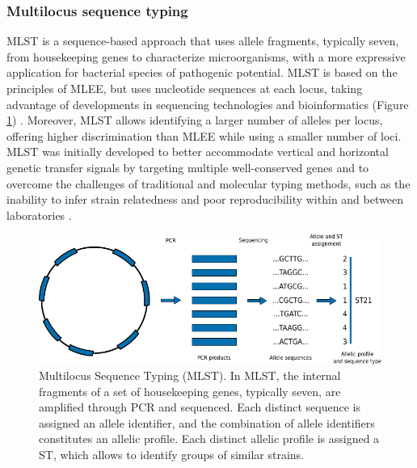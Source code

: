 \subsubsection{Multilocus sequence typing}

\ac{MLST} is a sequence-based approach that uses allele fragments, typically seven, from housekeeping genes to characterize microorganisms, with a more expressive application for bacterial species of pathogenic potential. \ac{MLST} is based on the principles of \ac{MLEE}, but uses nucleotide sequences at each locus, taking advantage of developments in sequencing technologies and bioinformatics (Figure \ref{fig:introduction_figure7}) \cite{urwin_multi-locus_2003}. Moreover, \ac{MLST} allows identifying a larger number of alleles per locus, offering higher discrimination than \ac{MLEE} while using a smaller number of loci. \ac{MLST} was initially developed to better accommodate vertical and horizontal genetic transfer signals by targeting multiple well-conserved genes and to overcome the challenges of traditional and molecular typing methods, such as the inability to infer strain relatedness and poor reproducibility within and between laboratories \cite{maiden_multilocus_1998}.

\begin{figure}[h!]
    \centering
    \includegraphics[angle=0,width=\textwidth]{figures/introduction/Figure7.pdf}
    \caption[Multilocus Sequence Typing]{Multilocus Sequence Typing (MLST). In \ac{MLST}, the internal fragments of a set of housekeeping genes, typically seven, are amplified through \ac{PCR} and sequenced. Each distinct sequence is assigned an allele identifier, and the combination of allele identifiers constitutes an allelic profile. Each distinct allelic profile is assigned a \ac{ST}, which allows to identify groups of similar strains.}
    \label{fig:introduction_figure7}
\end{figure}

